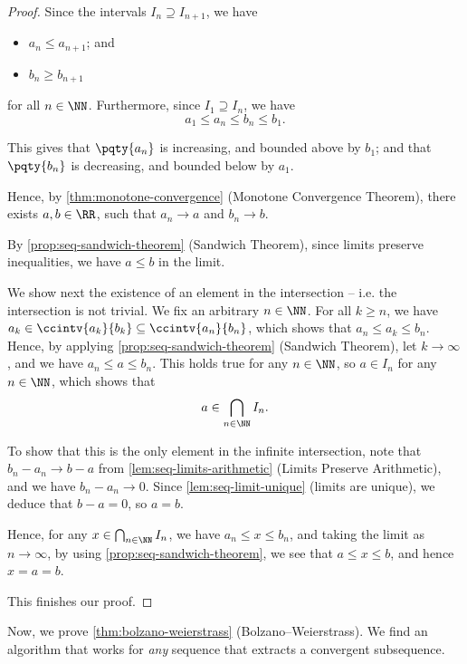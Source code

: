 \begin{proof}
    Since the intervals \(I_n \supseteq I_{n + 1}\), we have
    \begin{itemize}
        \item \(a_n \leq a_{n + 1}\); and
        \item \(b_n \geq b_{n + 1}\)
    \end{itemize}
    for all \(n \in \NN\). Furthermore, since \(I_1 \supseteq I_n\), we have
    \[
        a_1 \leq a_n \leq b_n \leq b_1.
    \]

    This gives that \(\pqty{a_n}\) is increasing, and bounded above by \(b_1\); and that \(\pqty{b_n}\) is decreasing, and bounded below by \(a_1\).

    Hence, by \autoref{thm:monotone-convergence} (Monotone Convergence Theorem), there exists \(a, b \in \RR\), such that \(a_n \to a\) and \(b_n \to b\).
    
    By \autoref{prop:seq-sandwich-theorem} (Sandwich Theorem), since limits preserve inequalities, we have \(a \leq b\) in the limit.

    We show next the existence of an element in the intersection -- i.e. the intersection is not trivial. We fix an arbitrary \(n \in \NN\). For all \(k \geq n\), we have \(a_k \in \ccintv{a_k}{b_k} \subseteq \ccintv{a_n}{b_n}\), which shows that \(a_n \leq a_k \leq b_n\). Hence, by applying \autoref{prop:seq-sandwich-theorem} (Sandwich Theorem), let \(k \to \infty\), and we have \(a_n \leq a \leq b_n\). This holds true for any \(n \in \NN\), so \(a \in I_n\) for any \(n \in \NN\), which shows that
    \[
        a \in \bigcap_{n \in \NN} I_n.
    \]

    To show that this is the only element in the infinite intersection, note that \(b_n - a_n \to b - a\) from \autoref{lem:seq-limits-arithmetic} (Limits Preserve Arithmetic), and we have \(b_n - a_n \to 0\). Since \autoref{lem:seq-limit-unique} (limits are unique), we deduce that \(b - a = 0\), so \(a = b\).

    Hence, for any \(x \in \bigcap_{n \in \NN} I_n\), we have \(a_n \leq x \leq b_n\), and taking the limit as \(n \to \infty\), by using \autoref{prop:seq-sandwich-theorem}, we see that \(a \leq x \leq b\), and hence \(x = a = b\).

    This finishes our proof.
\end{proof}

Now, we prove \autoref{thm:bolzano-weierstrass} (Bolzano--Weierstrass). We find an algorithm that works for \emph{any} sequence that extracts a convergent subsequence.

